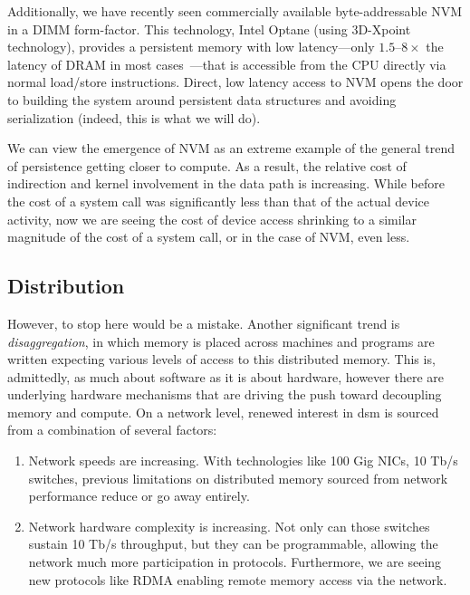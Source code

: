 Additionally, we have recently seen commercially available byte-addressable NVM in a DIMM form-factor. This technology, Intel Optane (using 3D-Xpoint technology), provides a persistent memory
with low latency---only $1.5$--$8\times$ the latency of DRAM in most cases~\cite{ucsd_bnvm}---that is accessible from the CPU directly via normal load/store instructions. Direct, low latency
access to NVM opens the door to building the system around persistent data structures and avoiding serialization (indeed, this is what we will do).

We can view the emergence of NVM as an extreme example of the general trend of persistence getting closer to compute. As a result, the relative cost of indirection and kernel involvement in
the data path is increasing. While before the cost of a system call was significantly less than that of the actual device activity, now we are seeing the cost of device access shrinking to a
similar magnitude of the cost of a system call, or in the case of NVM, even less.

\subsection{Distribution}

However, to stop here would be a mistake. Another significant trend is \emph{disaggregation}, in which memory is placed across machines and programs are written expecting various levels of
access to this distributed memory. This is, admittedly, as much about software as it is about hardware, however there are underlying hardware mechanisms that are driving the push toward
decoupling memory and compute. On a network level, renewed interest in \ac{dsm} is sourced from a combination of several factors:

\begin{enumerate}
    \item Network speeds are increasing. With technologies like 100 Gig NICs, 10 Tb/s switches, previous limitations on distributed memory sourced from network performance reduce or go away entirely.
    \item Network hardware complexity is increasing. Not only can those switches sustain 10 Tb/s throughput, but they can be programmable, allowing the network much more participation in
          protocols. Furthermore, we are seeing new protocols like RDMA enabling remote memory access via the network.
\end{enumerate}

